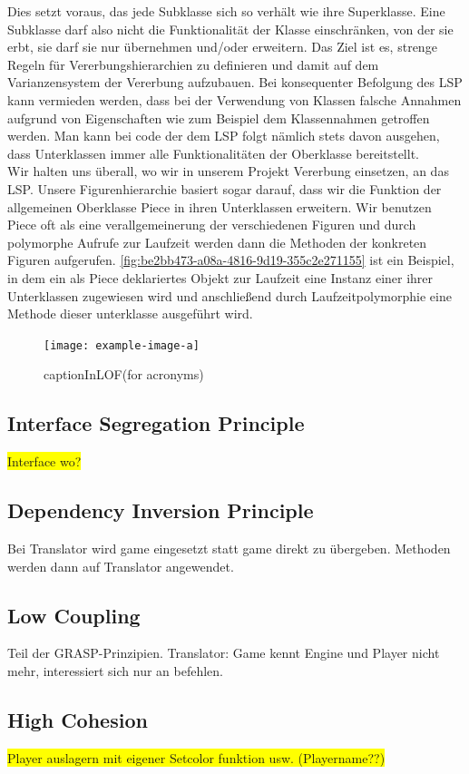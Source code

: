 \documentclass[
10pt, %
a4paper, %
oneside, %
headinclude,footinclude, %
BCOR5mm, %
]{scrartcl}
\begin{document}
Dies setzt voraus, das jede Subklasse sich so verhält wie ihre Superklasse. Eine Subklasse darf also nicht die Funktionalität der Klasse einschränken, von der sie erbt, sie darf sie nur übernehmen und/oder erweitern. Das Ziel ist es, strenge Regeln für Vererbungshierarchien zu definieren und damit auf dem Varianzensystem der Vererbung aufzubauen. Bei konsequenter Befolgung des LSP kann vermieden werden, dass bei der Verwendung von Klassen falsche Annahmen aufgrund von Eigenschaften wie zum Beispiel dem Klassennahmen getroffen werden. Man kann bei code der dem LSP folgt nämlich stets davon ausgehen, dass Unterklassen immer alle Funktionalitäten der Oberklasse bereitstellt.
\\
Wir halten uns überall, wo wir in unserem Projekt Vererbung einsetzen, an das LSP. Unsere Figurenhierarchie basiert sogar darauf, dass wir die Funktion der allgemeinen Oberklasse Piece in ihren Unterklassen erweitern. Wir benutzen Piece oft als eine verallgemeinerung der verschiedenen Figuren und durch polymorphe Aufrufe zur Laufzeit werden dann die Methoden der konkreten Figuren aufgerufen. \autoref{fig:be2bb473-a08a-4816-9d19-355c2e271155} ist ein Beispiel, in dem ein als Piece deklariertes Objekt zur Laufzeit eine Instanz einer ihrer Unterklassen zugewiesen wird und anschließend durch Laufzeitpolymorphie eine Methode dieser unterklasse ausgeführt wird.

\begin{figure}[ht]
	\texttt{[image: example-image-a]}
	\caption[captionInLOF(for acronyms)]{captionInLOF(for acronyms)}
	\label{fig:be2bb473-a08a-4816-9d19-355c2e271155}
\end{figure}
\subsection{Interface Segregation Principle}
\colorbox{yellow}{Interface wo?}
\subsection{Dependency Inversion Principle}
Bei Translator wird game eingesetzt statt game direkt zu übergeben. Methoden werden dann auf Translator angewendet.
\subsection{Low Coupling}
Teil der GRASP-Prinzipien.
Translator: Game kennt Engine und Player nicht mehr, interessiert sich nur an befehlen.
\subsection{High Cohesion}
\colorbox{yellow}{Player auslagern mit eigener Setcolor funktion usw. (Playername??)}
\end{document}
